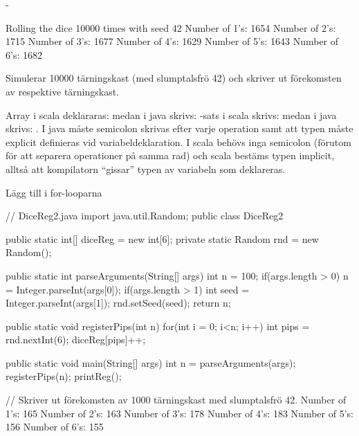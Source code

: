 {\Task %



\Task %

\Subtask -

\Subtask \begin{REPL}
Rolling the dice 10000 times with seed 42
Number of 1's: 1654
Number of 2's: 1715
Number of 3's: 1677
Number of 4's: 1629
Number of 5's: 1643
Number of 6's: 1682
\end{REPL}
Simulerar 10000 tärningskast (med slumptalsfrö 42) och skriver ut förekomsten av respektive tärningskast.

\Subtask Array i scala deklararas:  medan i java skrivs: 
-sats i scala skrivs:  medan i java skrivs: . 
I java måste semicolon skrivas efter varje operation samt att typen måste explicit definieras vid variabeldeklaration. 
I scala behövs inga semicolon (förutom för att separera operationer på samma rad) och scala bestäms typen implicit, alltså att kompilatorn “gissar” typen av variabeln som deklareras.

\Subtask Lägg till  i for-looparna

\Subtask \begin{Code}[language=Java] 
// DiceReg2.java
import java.util.Random;
public class DiceReg2{
	public static int[] diceReg = new int[6];
	private static Random rnd = new Random();
	
	public static int parseArguments(String[] args){
		int n = 100;
		if(args.length > 0) {
			n = Integer.parseInt(args[0]);
		}
		if(args.length > 1) {
			int seed = Integer.parseInt(args[1]);
			rnd.setSeed(seed);
		}
		return n;
	}
	
	public static void registerPips(int n) {
		for(int i = 0; i<n; i++) {
			int pips = rnd.nextInt(6);
			diceReg[pips]++;
		}
	}
	
	public static void main(String[] args) {
		int n = parseArguments(args);
		registerPips(n);
		printReg();
	}
}
\end{Code}

\Subtask \begin{REPL} 
  // Skriver ut förekomsten av 1000 tärningskast med slumptalsfrö 42.
Number of 1's: 165
Number of 2's: 163
Number of 3's: 178
Number of 4's: 183
Number of 5's: 156
Number of 6's: 155


\end{REPL}}
